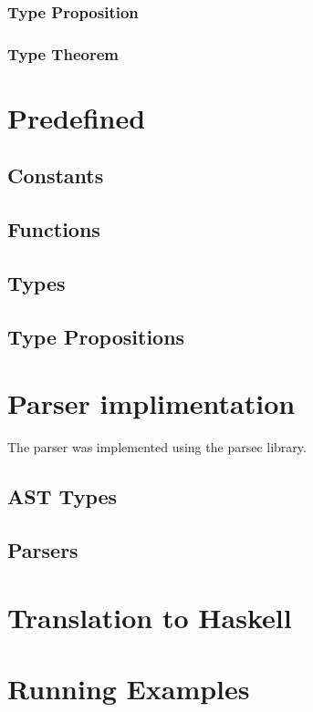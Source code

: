 \documentclass{article}
\def\H{Haskell}
\begin{document}
\subsubsection{Type Proposition}

\subsubsection{Type Theorem}

\section{Predefined}

\subsection{Constants}

\subsection{Functions}

\subsection{Types}

\subsection{Type Propositions}

\section{Parser implimentation}

The parser was implemented using the parsec library.

\subsection{AST Types}

\subsection{Parsers}

\section{Translation to \H}

\section{Running Examples}
\end{document}
